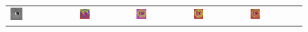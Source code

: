 \begin{figure}[h!]
\setlength\tabcolsep{1pt}
\def\arraystretch{0.5}
\begin{tabular}{p{}p{}p{}p{}p{}}
	\includegraphics[width=0.2\textwidth]{images/Gre13_01.jpg} &
	\includegraphics[width=0.2\textwidth]{images/gen/GEN_filterbanks_Gre13_01_TSUGF.png} &
	\includegraphics[width=0.2\textwidth]{images/gen/GEN_filterbanks_Gre13_01_LM.png} &
	\includegraphics[width=0.2\textwidth]{images/gen/GEN_filterbanks_Gre13_01_S.png} &
	\includegraphics[width=0.2\textwidth]{images/gen/GEN_filterbanks_Gre13_01_MR.png} \\
	

\end{tabular}
\end{figure}
